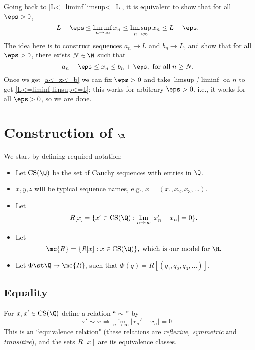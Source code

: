 \medskip

Going back to \cref{L<=liminf limsup<=L}, it is equivalent to show that for all \(\eps>0\),
\begin{equation*}
	L-\eps\leq\liminf_{n\to\infty}x_n\leq\limsup_{n\to\infty}x_n\leq L+\eps.
\end{equation*}
The idea here is to construct sequences \(a_n\to L\) and \(b_n\to L\), and show that for all \(\eps>0\), there exists \(N\in\N\) such that 
\begin{equation}
	a_n-\eps\leq x_n\leq b_n+\eps,~\text{for all}~n\geq N\label{a<=x<=b}.
\end{equation}
Once we get \cref{a<=x<=b} we can fix \(\eps>0\) and take \(\limsup/\liminf\) on \(n\) to get \cref{L<=liminf limsup<=L}; this works for arbitrary \(\eps>0\), i.e., it works for all \(\eps>0\), so we are done.

\section{Construction of \(\R\)}
\begin{notation}
	We start by defining required notation:
	\begin{itemize}
		\item Let \(\operatorname{CS}(\Q)\) be the set of Cauchy sequences with entries in \(\Q\).
		
		\item \(x,y,z\) will be typical sequence names, e.g., \(x=(x_1,x_2,x_3,\dots)\).
		
		\item Let 
		\begin{equation*}
			R[x]=\{x'\in \operatorname{CS}(\Q):\lim_{n\to\infty}|x_n'-x_n|=0\}.
		\end{equation*}
		
		\item Let
		\begin{equation*}
			\mc{R}=\{R[x]:x\in\operatorname{CS}(\Q)\},~\text{which is our model for \(\R\)}.
 		\end{equation*}
 		
 		\item Let \(\Phi\st\Q\to\mc{R}\), such that \(\Phi(q)=R[(q_1,q_2,q_3,\dots)]\).
	\end{itemize}
\end{notation}

\subsection{Equality}
For \(x,x'\in\operatorname{CS}(\Q)\) define a relation \(``\sim"\) by 
\begin{equation*}
	x'\sim x\iff \lim_{n\to\infty}|x_n'-x_n|=0.
\end{equation*}
This is an ``equivalence relation" (these relations are \emph{reflexive, symmetric} and \emph{transitive}), and the sets \(R[x]\) are its equivalence classes.

